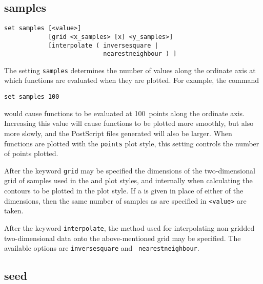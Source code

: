 %
%


\subsection{samples}

\begin{verbatim}
set samples [<value>]
            [grid <x_samples> [x] <y_samples>]
            [interpolate ( inversesquare |
                           nearestneighbour ) ]
\end{verbatim}

The setting {\tt samples} determines the number of values along the ordinate
axis at which functions are evaluated when they are plotted. For example, the
command

\begin{verbatim}
set samples 100
\end{verbatim}

\noindent would cause functions to be evaluated at 100~points along the
ordinate axis.  Increasing this value will cause functions to be plotted more
smoothly, but also more slowly, and the PostScript files generated will also be
larger. When functions are plotted with the {\tt points} plot style, this
setting controls the number of points plotted.

After the keyword {\tt grid} may be specified the dimensions of the
two-dimensional grid of samples used in the  and
 plot styles, and internally when calculating the contours to
be plotted in the  plot style. If a {\tt *} is given in
place of either of the dimensions, then the same number of samples as are
specified in {\tt <value>} are taken.

After the keyword {\tt interpolate}, the method used for interpolating
non-gridded two-dimensional data onto the above-mentioned grid may be
specified. The available options are {\tt inversesquare} and {\tt
nearestneighbour}.


\subsection{seed}

